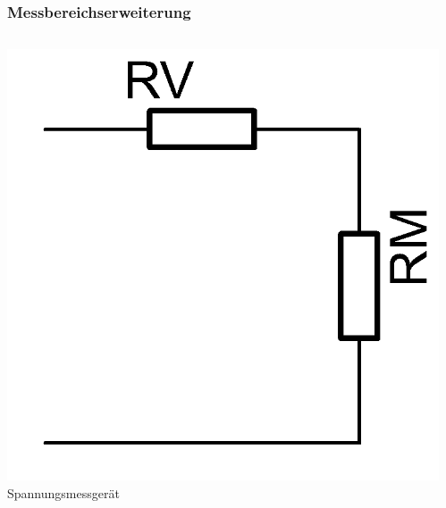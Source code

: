 \begin{frame}
  \frametitle{Messbereichserweiterung}
  \begin{columns}
    \begin{center}
      \includegraphics[width=\textwidth,height=.5\textheight,keepaspectratio]{a16/Messbereichserweiterung-Spannung.png}\\
      Spannungsmessgerät
    \end{center}
    \begin{center}

\end{center}
\end{columns}
\end{frame}
